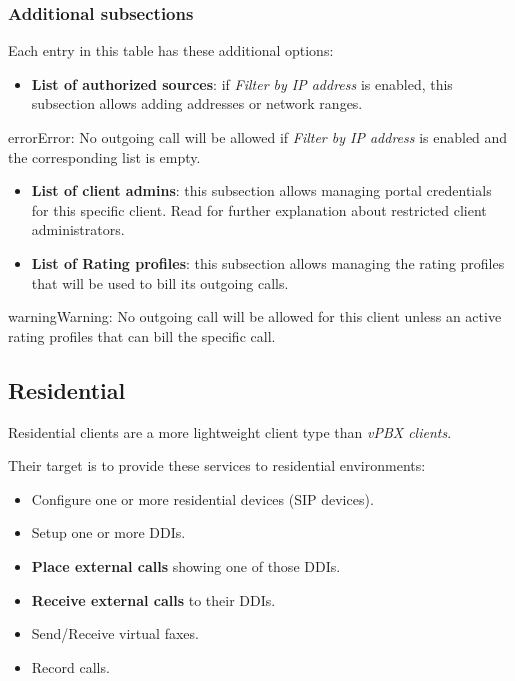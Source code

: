 \documentclass[letterpaper,10pt,english]{sphinxmanual}
\begin{document}
\subsubsection{Additional subsections}
\label{administration_portal/brand/clients/virtual_pbx:additional-subsections}
Each entry in this table has these additional options:
\begin{itemize}
\item {} 
\textbf{List of authorized sources}: if \emph{Filter by IP address} is enabled, this subsection allows adding addresses or network ranges.

\end{itemize}

\begin{notice}{error}{Error:}
No outgoing call will be allowed if \emph{Filter by IP address} is enabled and the corresponding list is empty.
\end{notice}
\begin{itemize}
\item {} 
\textbf{List of client admins}: this subsection allows managing portal credentials for this specific client. Read {\hyperref[api_rest/acls:acls]{}}
for further explanation about restricted client administrators.

\item {} 
\textbf{List of Rating profiles}: this subsection allows managing the rating profiles that will be used to bill its outgoing calls.

\end{itemize}

\begin{notice}{warning}{Warning:}
No outgoing call will be allowed for this client unless an active rating profiles that can
bill the specific call.
\end{notice}


\subsection{Residential}
\label{administration_portal/brand/clients/residential:residential}\label{administration_portal/brand/clients/residential::doc}
Residential clients are a more lightweight client type than \emph{vPBX clients}.

Their target is to provide these services to residential environments:
\begin{itemize}
\item {} 
Configure one or more residential devices (SIP devices).

\item {} 
Setup one or more DDIs.

\item {} 
\textbf{Place external calls} showing one of those DDIs.

\item {} 
\textbf{Receive external calls} to their DDIs.

\item {} 
Send/Receive virtual faxes.

\item {} 
Record calls.

\end{itemize}
\end{document}
